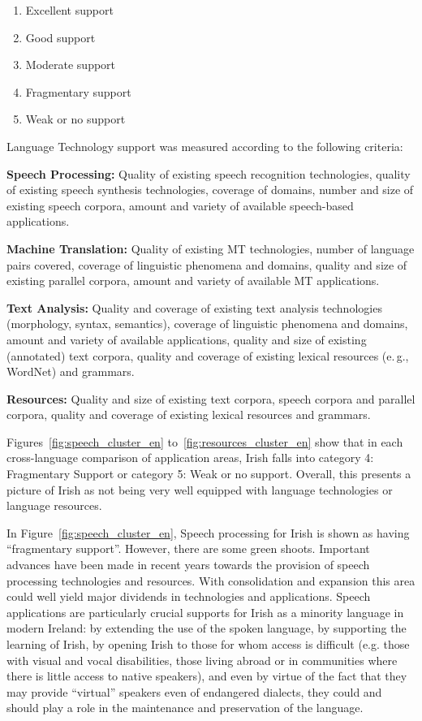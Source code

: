 \begin{multicols}{2}
\begin{enumerate}
\item Excellent support
\item Good support
\item Moderate support
\item Fragmentary support
\item Weak or no support
\end{enumerate}

Language Technology support was measured according to the following criteria:

\textbf{Speech Processing:} Quality of existing speech recognition technologies, quality of existing speech synthesis technologies, coverage of domains, number and size of existing speech corpora, amount and variety of available speech-based applications.

\textbf{Machine Translation:} Quality of existing MT technologies, number of language pairs covered, coverage of linguistic phenomena and domains, quality and size of existing parallel corpora, amount and variety of available MT applications.

\textbf{Text Analysis:} Quality and coverage of existing text analysis technologies (morphology, syntax, semantics), coverage of linguistic phenomena and domains, amount and variety of available applications, quality and size of existing (annotated) text corpora, quality and coverage of existing lexical resources (e.\,g., WordNet) and grammars.

\textbf{Resources:} Quality and size of existing text corpora, speech corpora and parallel corpora, quality and coverage of existing lexical resources and grammars.

Figures~\ref{fig:speech_cluster_en} to~\ref{fig:resources_cluster_en} show that in each cross-language comparison of application areas,  Irish falls into category 4: Fragmentary Support or category 5: Weak or no support. Overall, this presents a picture of Irish as not being very well equipped with language technologies or language resources. 

In Figure~\ref{fig:speech_cluster_en}, Speech processing for Irish is shown as having ``fragmentary support''. However, there are some green shoots. Important advances have been made in recent years towards the provision of speech processing technologies and resources. With consolidation and expansion this area could well yield major dividends in technologies and applications. Speech applications are particularly crucial supports for Irish as a minority language in modern Ireland: by extending the use of the spoken language, by supporting the learning of Irish, by opening Irish to those for whom access is difficult (e.g. those with visual and vocal disabilities, those living abroad or in communities where there is little access to native speakers), and even by virtue of the fact that they may provide ``virtual'' speakers even of endangered dialects, they could and should play a role in the maintenance and preservation of the language. 


\end{multicols}
